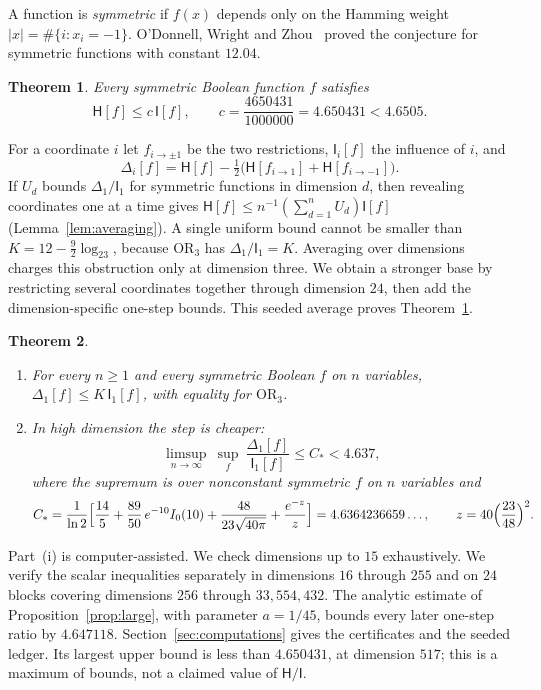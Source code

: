 \documentclass[11pt]{amsart}
\newtheorem{mainthm}{Theorem}
\theoremstyle{definition}
\theoremstyle{remark}
\newcommand{\HH}{\mathsf H}
\newcommand{\I}{\mathsf I}
\begin{document}
A function is \emph{symmetric} if $f(x)$ depends only on the Hamming weight $|x|=\#\{i:x_i=-1\}$. O'Donnell, Wright and Zhou~\cite{OWZ11} proved the conjecture for symmetric functions with constant $12.04$.

\begin{mainthm}\label{thm:main}
Every symmetric Boolean function $f$ satisfies
\[
 \HH[f]\le c\,\I[f],\qquad c=\frac{4650431}{1000000}=4.650431<4.6505.
\]
\end{mainthm}

For a coordinate $i$ let $f_{i\to\pm1}$ be the two restrictions, $\I_i[f]$ the influence of $i$, and
\[
 \Delta_i[f]=\HH[f]-\tfrac12\bigl(\HH[f_{i\to1}]+\HH[f_{i\to-1}]\bigr).
\]
If $U_d$ bounds $\Delta_1/\I_1$ for symmetric functions in dimension $d$, then revealing coordinates one at a time gives $\HH[f]\le n^{-1}(\sum_{d=1}^nU_d)\I[f]$ (Lemma~\ref{lem:averaging}). A single uniform bound cannot be smaller than $K=12-\frac92\log_23$, because $\mathrm{OR}_3$ has $\Delta_1/\I_1=K$. Averaging over dimensions charges this obstruction only at dimension three. We obtain a stronger base by restricting several coordinates together through dimension $24$, then add the dimension-specific one-step bounds. This seeded average proves Theorem~\ref{thm:main}.

\begin{mainthm}\label{thm:restriction}
\begin{enumerate}[label=\textup{(\roman*)}]
\item For every $n\ge1$ and every symmetric Boolean $f$ on $n$ variables, $\Delta_1[f]\le K\,\I_1[f]$, with equality for $\mathrm{OR}_3$.
\item In high dimension the step is cheaper:
\[
 \limsup_{n\to\infty}\ \sup_{f}\ \frac{\Delta_1[f]}{\I_1[f]}\le C_*<4.637,
\]
where the supremum is over nonconstant symmetric $f$ on $n$ variables and
\[
 C_*=\frac{1}{\ln2}\Bigl[\frac{14}{5}+\frac{89}{50}\,e^{-10}I_0(10)+\frac{48}{23\sqrt{40\pi}}+\frac{e^{-z}}{z}\Bigr]=4.6364236659\ldots,\qquad z=40\Bigl(\frac{23}{48}\Bigr)^2.
\]
\end{enumerate}
\end{mainthm}

Part~(i) is computer-assisted. We check dimensions up to $15$ exhaustively. We verify the scalar inequalities separately in dimensions $16$ through $255$ and on $24$ blocks covering dimensions $256$ through $33{,}554{,}432$. The analytic estimate of Proposition~\ref{prop:large}, with parameter $a=1/45$, bounds every later one-step ratio by $4.647118$. Section~\ref{sec:computations} gives the certificates and the seeded ledger. Its largest upper bound is less than $4.650431$, at dimension $517$; this is a maximum of bounds, not a claimed value of $\HH/\I$.
\end{document}
